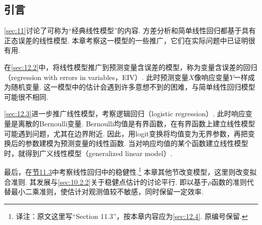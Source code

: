 \subsection{引言}\label{sec:12.1}
\autoref{sec:11}讨论了可称为“经典线性模型”的内容. 方差分析和简单线性回归都基于具有正态误差的线性模型. 本章考察这一模型的一些推广，它们在实际问题中已证明很有用.

在\autoref{sec:12.2}中，将线性模型推广到预测变量含误差的模型，称为变量含误差的回归（regression with errors in variables，EIV）. 此时预测变量$X$像响应变量$Y$一样成为随机变量. 这一模型中的估计会遇到许多意想不到的困难，与简单线性回归模型可能很不相同.

\autoref{sec:12.3}进一步推广线性模型，考察逻辑回归（logistic regression）. 此时响应变量是离散的Bernoulli变量. Bernoulli均值是有界函数，在有界函数上建立线性模型可能遇到问题，尤其在边界附近. 因此，用logit变换将均值变为无界参数，再把变换后的参数建模为预测变量的线性函数. 当对响应均值的某个函数建立线性模型时，就得到广义线性模型（generalized linear model）.

最后，在\hyperref[sec:12.4]{节11.3}中考察线性回归中的稳健性.\footnote{译注：原文这里写“Section 11.3”，按本章内容应为\autoref{sec:12.4}. 原编号保留.} 本章其他节改变模型，这里则改变拟合准则. 其发展与\autoref{sec:10.2.2}关于稳健点估计的讨论平行. 即以基于$\rho$函数的准则代替最小二乘准则，使估计对观测值较不敏感，同时保留一定效率.
